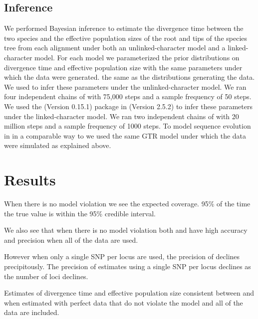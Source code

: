 \subsection{Inference}
We performed Bayesian inference to estimate the divergence time between the two species and the effective 
population sizes of the root and tips of the species tree from each alignment 
under both an unlinked-character model and a linked-character model. For each 
model we parameterized the prior distributions on divergence time and effective
population size with the same parameters under which the data were generated. 
the same as the distributions generating the data.
We used \ecoevolity
\citep[Version 0.3.2; dev branch commit a7e9bf2;][]{Oaks2018ecoevolity}
to infer these parameters under the 
unlinked-character model.
We ran four independent chains of \ecoevolity with 75,000 steps and a sample 
frequency of 50 steps.
We used the \beast (Version 0.15.1) \citep{@ogilvieStarBEAST2BringsFaster2017} 
package in \beastcore (Version 2.5.2) \citep{@bouckaertBEASTSoftwarePlatform2014}
to infer these parameters under the linked-character model. 
We ran two independent chains of \beast with 20 million steps and a 
sample frequency of 1000 steps. 
To model sequence evolution in \beast in a comparable way to \ecoevolity we used 
the same GTR model under which the data were simulated as explained above.

\section{Results}

When there is no model violation we see the expected coverage. 95\% of the time
the true value is within the 95\% credible interval.

We also see that when there is no model violation both \ecoevolity and \beast
have high accuracy and precision when all of the data are used. 

However when only 
a single SNP per locus are used, the precision of \ecoevolity declines precipitously.
The precision of \ecoevolity estimates using a single SNP per locus declines as 
the number of loci declines.      

Estimates of divergence time and effective population size consistent between \beast
and \ecoevolity when estimated with perfect data that do not violate the model
and all of the data are included.






